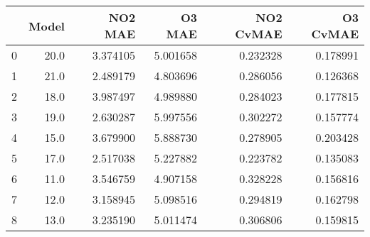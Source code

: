 \begin{tabular}{lrrrrr}
\toprule
{} &  Model &   NO2 MAE &    O3 MAE &  NO2 CvMAE &  O3 CvMAE \\
\midrule
0 &   20.0 &  3.374105 &  5.001658 &   0.232328 &  0.178991 \\
1 &   21.0 &  2.489179 &  4.803696 &   0.286056 &  0.126368 \\
2 &   18.0 &  3.987497 &  4.989880 &   0.284023 &  0.177815 \\
3 &   19.0 &  2.630287 &  5.997556 &   0.302272 &  0.157774 \\
4 &   15.0 &  3.679900 &  5.888730 &   0.278905 &  0.203428 \\
5 &   17.0 &  2.517038 &  5.227882 &   0.223782 &  0.135083 \\
6 &   11.0 &  3.546759 &  4.907158 &   0.328228 &  0.156816 \\
7 &   12.0 &  3.158945 &  5.098516 &   0.294819 &  0.162798 \\
8 &   13.0 &  3.235190 &  5.011474 &   0.306806 &  0.159815 \\
\bottomrule
\end{tabular}
